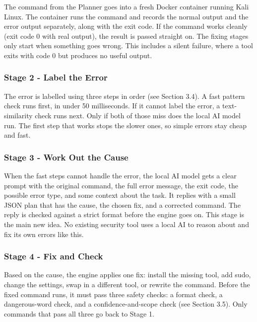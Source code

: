 \documentclass[
]{article}
\begin{document}
The command from the Planner goes into a fresh Docker container running
Kali Linux. The container runs the command and records the normal output
and the error output separately, along with the exit code. If the
command works cleanly (exit code 0 with real output), the result is
passed straight on. The fixing stages only start when something goes
wrong. This includes a silent failure, where a tool exits with code 0
but produces no useful output.

\hypertarget{stage-2---label-the-error}{%
\subsubsection{Stage 2 - Label the
Error}\label{stage-2---label-the-error}}

The error is labelled using three steps in order (see Section 3.4). A
fast pattern check runs first, in under 50 milliseconds. If it cannot
label the error, a text-similarity check runs next. Only if both of
those miss does the local AI model run. The first step that works stops
the slower ones, so simple errors stay cheap and fast.

\hypertarget{stage-3---work-out-the-cause}{%
\subsubsection{Stage 3 - Work Out the
Cause}\label{stage-3---work-out-the-cause}}

When the fast steps cannot handle the error, the local AI model gets a
clear prompt with the original command, the full error message, the exit
code, the possible error type, and some context about the task. It
replies with a small JSON plan that has the cause, the chosen fix, and a
corrected command. The reply is checked against a strict format before
the engine goes on. This stage is the main new idea. No existing
security tool uses a local AI to reason about and fix its own errors
like this.

\hypertarget{stage-4---fix-and-check}{%
\subsubsection{Stage 4 - Fix and Check}\label{stage-4---fix-and-check}}

Based on the cause, the engine applies one fix: install the missing
tool, add sudo, change the settings, swap in a different tool, or
rewrite the command. Before the fixed command runs, it must pass three
safety checks: a format check, a dangerous-word check, and a
confidence-and-scope check (see Section 3.5). Only commands that pass
all three go back to Stage 1.
\end{document}
